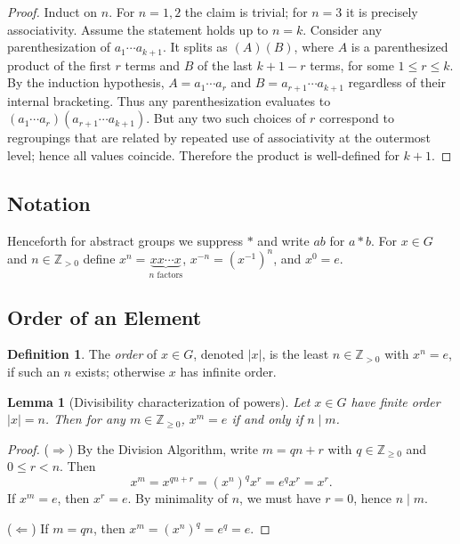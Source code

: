 \documentclass[12pt]{article}
\newtheorem{lemma}[theorem]{Lemma}
\theoremstyle{definition}
\newtheorem{definition}{Definition}
\begin{document}
\begin{proof}
Induct on $n$. For $n=1,2$ the claim is trivial; for $n=3$ it is precisely associativity. Assume the statement holds up to $n=k$.
Consider any parenthesization of $a_1\cdots a_{k+1}$. It splits as $(A)(B)$, where $A$ is a parenthesized product of the first $r$ terms and $B$
of the last $k+1-r$ terms, for some $1\le r\le k$. By the induction hypothesis, $A=a_1\cdots a_r$ and $B=a_{r+1}\cdots a_{k+1}$ regardless of their internal bracketing.
Thus any parenthesization evaluates to $(a_1\cdots a_r)(a_{r+1}\cdots a_{k+1})$. But any two such choices of $r$ correspond to regroupings that
are related by repeated use of associativity at the outermost level; hence all values coincide. Therefore the product is well-defined for $k+1$.
\end{proof}

\subsection*{Notation}
Henceforth for abstract groups we suppress $*$ and write $ab$ for $a*b$. For $x\in G$ and $n\in\mathbb{Z}_{>0}$ define
$x^n=\underbrace{xx\cdots x}_{n\text{ factors}}$, $x^{-n}=(x^{-1})^n$, and $x^0=e$.

\subsection*{Order of an Element}

\begin{definition}
The \emph{order} of $x\in G$, denoted $|x|$, is the least $n\in\mathbb{Z}_{>0}$ with $x^n=e$, if such an $n$ exists; otherwise $x$ has infinite order.
\end{definition}

\begin{lemma}[Divisibility characterization of powers]
Let $x\in G$ have finite order $|x|=n$. Then for any $m\in\mathbb{Z}_{\ge 0}$, $x^m=e$ if and only if $n\mid m$.
\end{lemma}

\begin{proof}
($\Rightarrow$) By the Division Algorithm, write $m=qn+r$ with $q\in\mathbb{Z}_{\ge 0}$ and $0\le r<n$. Then
\[
x^m=x^{qn+r}=(x^n)^q x^r=e^q x^r = x^r.
\]
If $x^m=e$, then $x^r=e$. By minimality of $n$, we must have $r=0$, hence $n\mid m$.

($\Leftarrow$) If $m=qn$, then $x^m=(x^n)^q=e^q=e$.
\end{proof}
\end{document}
